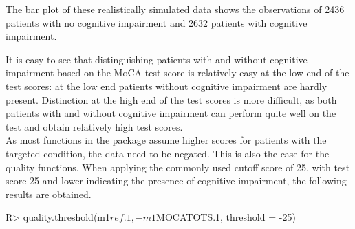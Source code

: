 \documentclass[
  nojss]{jss}
\begin{document}
The bar plot of these realistically simulated data shows the
observations of 2436 patients with no cognitive impairment and 2632
patients with cognitive impairment.

It is easy to see that distinguishing patients with and without
cognitive impairment based on the MoCA test score is relatively easy at
the low end of the test scores: at the low end patients without
cognitive impairment are hardly present. Distinction at the high end of
the test scores is more difficult, as both patients with and without
cognitive impairment can perform quite well on the test and obtain
relatively high test scores.\\
As most functions in the  package assume higher
scores for patients with the targeted condition, the data need to be
negated. This is also the case for the quality functions. When applying
the commonly used cutoff score of 25, with test score 25 and lower
indicating the presence of cognitive impairment, the following results
are obtained.

\begin{CodeChunk}

\begin{CodeInput}
R> quality.threshold(m1$ref.1, -m1$MOCATOTS.1, threshold = -25)
\end{CodeInput}

\end{CodeChunk}
\end{document}
